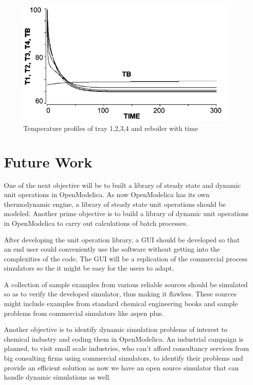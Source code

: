 \documentclass[12pt]{report}
\begin{document}
\begin{figure}
\centering
\includegraphics[width=1\linewidth]{Ingham3}
\caption{Temperature profiles of tray 1,2,3,4 and reboiler with time\cite{ingham}}
\label{Ingham3}
\end{figure}

\chapter{Future Work}
One of the next objective will be to built a library of steady state and dynamic unit operations in OpenModelica. As now OpenModelica has its own thermodynamic engine, a library of steady state unit operations should be modeled. Another prime objective is to build a library of dynamic unit operations in OpenModelica to carry out calculations of batch processes.

After developing the unit operation library, a GUI should be developed so that an end user could conveniently use the software without getting into the complexities of the code. The GUI will be a replication of the commercial process simulators so the it might be easy for the users to adapt.

A collection of sample examples from various reliable sources should be simulated so as to verify the developed simulator, thus making it flawless. These sources might include examples from standard chemical engineering books and sample problems from commercial simulators like aspen plus.

Another objective is to identify dynamic simulation problems of interest to chemical industry and coding them in OpenModelica. An industrial campaign is planned, to visit small scale industries, who can't afford consultancy services from big consulting firms using commercial simulators, to identify their problems and provide an efficient solution as now we have an open source simulator that can handle dynamic simulations as well.
\end{document}
